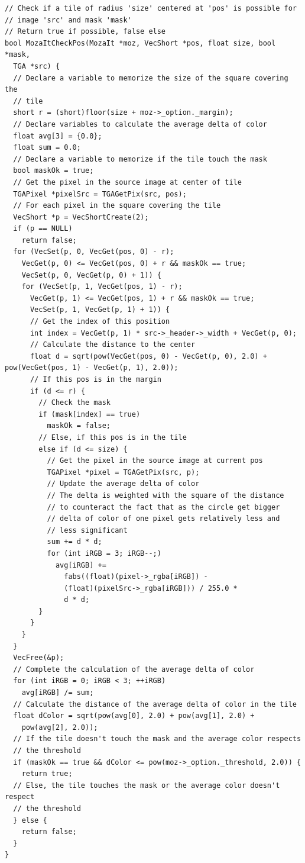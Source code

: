 \documentclass[12pt, a4paper]{article}
\begin{document}
\begin{scriptsize}
\begin{ttfamily}
\begin{lstlisting}
// Check if a tile of radius 'size' centered at 'pos' is possible for 
// image 'src' and mask 'mask'
// Return true if possible, false else
bool MozaItCheckPos(MozaIt *moz, VecShort *pos, float size, bool *mask, 
  TGA *src) { 
  // Declare a variable to memorize the size of the square covering the 
  // tile
  short r = (short)floor(size + moz->_option._margin);
  // Declare variables to calculate the average delta of color
  float avg[3] = {0.0};
  float sum = 0.0;
  // Declare a variable to memorize if the tile touch the mask
  bool maskOk = true;
  // Get the pixel in the source image at center of tile
  TGAPixel *pixelSrc = TGAGetPix(src, pos);
  // For each pixel in the square covering the tile
  VecShort *p = VecShortCreate(2);
  if (p == NULL)
    return false;
  for (VecSet(p, 0, VecGet(pos, 0) - r); 
    VecGet(p, 0) <= VecGet(pos, 0) + r && maskOk == true; 
    VecSet(p, 0, VecGet(p, 0) + 1)) {
    for (VecSet(p, 1, VecGet(pos, 1) - r); 
      VecGet(p, 1) <= VecGet(pos, 1) + r && maskOk == true; 
      VecSet(p, 1, VecGet(p, 1) + 1)) {
      // Get the index of this position
      int index = VecGet(p, 1) * src->_header->_width + VecGet(p, 0);
      // Calculate the distance to the center
      float d = sqrt(pow(VecGet(pos, 0) - VecGet(p, 0), 2.0) + pow(VecGet(pos, 1) - VecGet(p, 1), 2.0));
      // If this pos is in the margin
      if (d <= r) {
        // Check the mask
        if (mask[index] == true)
          maskOk = false;
        // Else, if this pos is in the tile
        else if (d <= size) {
          // Get the pixel in the source image at current pos
          TGAPixel *pixel = TGAGetPix(src, p);
          // Update the average delta of color
          // The delta is weighted with the square of the distance
          // to counteract the fact that as the circle get bigger 
          // delta of color of one pixel gets relatively less and
          // less significant 
          sum += d * d;
          for (int iRGB = 3; iRGB--;)
            avg[iRGB] += 
              fabs((float)(pixel->_rgba[iRGB]) - 
              (float)(pixelSrc->_rgba[iRGB])) / 255.0 *
              d * d;
        }
      }
    }
  }
  VecFree(&p);
  // Complete the calculation of the average delta of color
  for (int iRGB = 0; iRGB < 3; ++iRGB)
    avg[iRGB] /= sum;
  // Calculate the distance of the average delta of color in the tile
  float dColor = sqrt(pow(avg[0], 2.0) + pow(avg[1], 2.0) + 
    pow(avg[2], 2.0));
  // If the tile doesn't touch the mask and the average color respects
  // the threshold
  if (maskOk == true && dColor <= pow(moz->_option._threshold, 2.0)) {
    return true;
  // Else, the tile touches the mask or the average color doesn't respect
  // the threshold
  } else {
    return false;
  }
}


\end{lstlisting}
\end{ttfamily}
\end{scriptsize}
\end{document}
